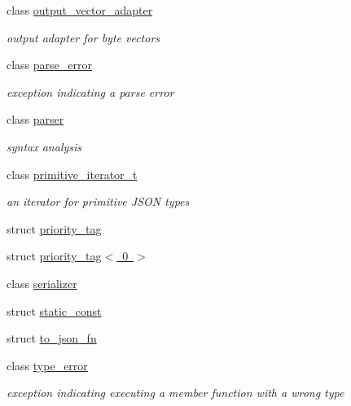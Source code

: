 \begin{DoxyCompactItemize}
class \mbox{\hyperlink{classnlohmann_1_1detail_1_1output__vector__adapter}{output\+\_\+vector\+\_\+adapter}}
\begin{DoxyCompactList}\small\item\em output adapter for byte vectors \end{DoxyCompactList}\item 
class \mbox{\hyperlink{classnlohmann_1_1detail_1_1parse__error}{parse\+\_\+error}}
\begin{DoxyCompactList}\small\item\em exception indicating a parse error \end{DoxyCompactList}\item 
class \mbox{\hyperlink{classnlohmann_1_1detail_1_1parser}{parser}}
\begin{DoxyCompactList}\small\item\em syntax analysis \end{DoxyCompactList}\item 
class \mbox{\hyperlink{classnlohmann_1_1detail_1_1primitive__iterator__t}{primitive\+\_\+iterator\+\_\+t}}
\begin{DoxyCompactList}\small\item\em an iterator for primitive J\+S\+ON types \end{DoxyCompactList}\item 
struct \mbox{\hyperlink{structnlohmann_1_1detail_1_1priority__tag}{priority\+\_\+tag}}
\item 
struct \mbox{\hyperlink{structnlohmann_1_1detail_1_1priority__tag_3_010_01_4}{priority\+\_\+tag$<$ 0 $>$}}
\item 
class \mbox{\hyperlink{classnlohmann_1_1detail_1_1serializer}{serializer}}
\item 
struct \mbox{\hyperlink{structnlohmann_1_1detail_1_1static__const}{static\+\_\+const}}
\item 
struct \mbox{\hyperlink{structnlohmann_1_1detail_1_1to__json__fn}{to\+\_\+json\+\_\+fn}}
\item 
class \mbox{\hyperlink{classnlohmann_1_1detail_1_1type__error}{type\+\_\+error}}
\begin{DoxyCompactList}\small\item\em exception indicating executing a member function with a wrong type \end{DoxyCompactList}\end{DoxyCompactItemize}
